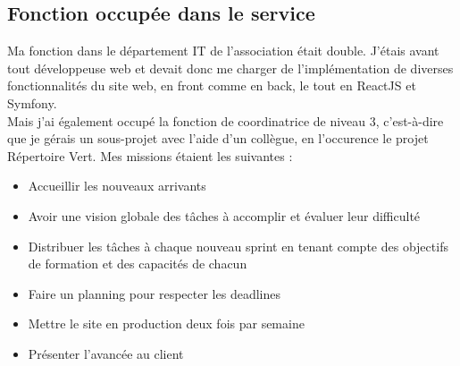 \pagebreak

\subsection{Fonction occupée dans le service}
Ma fonction dans le département IT de l'association était double. 
J'étais avant tout développeuse web et devait donc me charger de l'implémentation de diverses fonctionnalités du site web, en front comme en back, le tout en ReactJS et Symfony.
\\
Mais j'ai également occupé la fonction de coordinatrice de niveau 3, 
c'est-à-dire que je gérais un sous-projet avec l'aide d'un collègue, en l'occurence le projet Répertoire Vert. Mes missions étaient les suivantes :
\begin{itemize}
    \item Accueillir les nouveaux arrivants
    \item Avoir une vision globale des tâches à accomplir et évaluer leur difficulté
    \item Distribuer les tâches à chaque nouveau sprint en tenant compte des objectifs de formation et des capacités de chacun
    \item Faire un planning pour respecter les deadlines
    \item Mettre le site en production deux fois par semaine
    \item Présenter l'avancée au client
\end{itemize}






